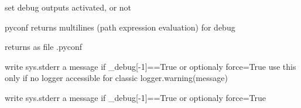 \documentclass[a4paper,10pt,english]{sphinxmanual}
\begin{document}

\begin{fulllineitems}
\label{\detokenize{apidoc_src/src:src.debug.push_debug}}
set debug outputs activated, or not

\end{fulllineitems}


\begin{fulllineitems}
\label{\detokenize{apidoc_src/src:src.debug.saveConfigDbg}}
pyconf returns multilines (path expression evaluation) for debug

\end{fulllineitems}


\begin{fulllineitems}
\label{\detokenize{apidoc_src/src:src.debug.saveConfigStd}}
returns as file .pyconf

\end{fulllineitems}


\begin{fulllineitems}
\label{\detokenize{apidoc_src/src:src.debug.tofix}}
write sys.stderr a message if \_debug{[}-1{]}==True or optionaly force=True
use this only if no logger accessible for classic logger.warning(message)

\end{fulllineitems}


\begin{fulllineitems}
\label{\detokenize{apidoc_src/src:src.debug.write}}
write sys.stderr a message if \_debug{[}-1{]}==True or optionaly force=True

\end{fulllineitems}
\end{document}
